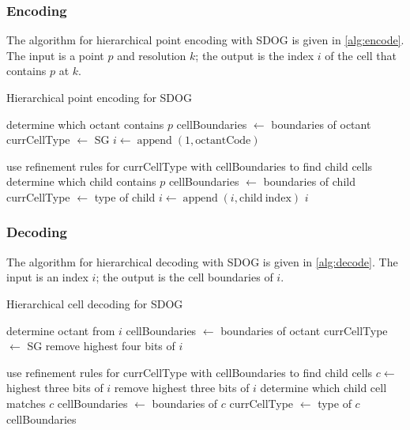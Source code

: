 \subsubsection{Encoding}
The algorithm for hierarchical point encoding with SDOG is given in \cref{alg:encode}.
The input is a point $p$ and resolution $k$; the output is the index $i$ of the cell that contains $p$ at $k$.


\begin{algorithm}
	\caption{Hierarchical point encoding for SDOG}
	
	\begin{algorithmic}
		
		\STATE determine which octant contains $p$
		\STATE cellBoundaries $\leftarrow$ boundaries of octant
		\STATE currCellType $\leftarrow$ SG
		\STATE $i \leftarrow \operatorname{append}(1, \mathrm{octantCode})$
		
		\STATE use refinement rules for currCellType with cellBoundaries to find child cells
		\STATE determine which child contains $p$
		\STATE cellBoundaries $\leftarrow$ boundaries of child
		\STATE currCellType $\leftarrow$ type of child
		\STATE $i \leftarrow \operatorname{append}(i, \mathrm{child~index})$
		\ENDFOR
		\RETURN $i$
		
	\end{algorithmic}
	\label{alg:encode}
\end{algorithm}


\subsubsection{Decoding}
The algorithm for hierarchical decoding with SDOG is given in \cref{alg:decode}.
The input is an index $i$; the output is the cell boundaries of $i$.


\begin{algorithm}
	\caption{Hierarchical cell decoding for SDOG}
	
	\begin{algorithmic}
		
		\STATE determine octant from $i$
		\STATE cellBoundaries $\leftarrow$ boundaries of octant
		\STATE currCellType $\leftarrow$ SG
		\STATE remove highest four bits of $i$
		
		\FOR{$k$ iterations}
		\STATE use refinement rules for currCellType with cellBoundaries to find child cells
		\STATE $c \leftarrow$ highest three bits of $i$
		\STATE remove highest three bits of $i$
		\STATE determine which child cell matches $c$
		\STATE cellBoundaries $\leftarrow$ boundaries of $c$
		\STATE currCellType $\leftarrow$ type of $c$
		\ENDFOR
		\RETURN cellBoundaries
		
	\end{algorithmic}
	\label{alg:decode}
\end{algorithm}


